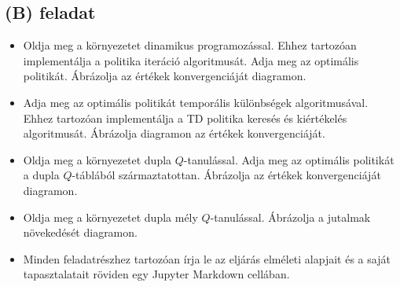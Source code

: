 \documentclass[english]{article}
\begin{document}
\subsection{(\textbf{B}) feladat}
\begin{itemize}
	\item Oldja meg a környezetet dinamikus programozással. Ehhez tartozóan implementálja a politika iteráció algoritmusát. Adja meg az optimális politikát. Ábrázolja az értékek konvergenciáját diagramon.
	\item Adja meg az optimális politikát temporális különbségek algoritmusával. Ehhez tartozóan implementálja a TD politika keresés és kiértékelés algoritmusát. Ábrázolja diagramon az értékek konvergenciáját. 
	\item Oldja meg a környezetet dupla $Q$-tanulással. Adja meg az optimális politikát a dupla $Q$-táblából származtatottan. Ábrázolja az értékek konvergenciáját diagramon. 
	\item Oldja meg a környezetet dupla mély $Q$-tanulással. Ábrázolja a jutalmak növekedését diagramon. 
	\item Minden feladatrészhez tartozóan írja le az eljárás elméleti alapjait és a saját tapasztalatait röviden egy Jupyter Markdown cellában.
\end{itemize}
\end{document}
